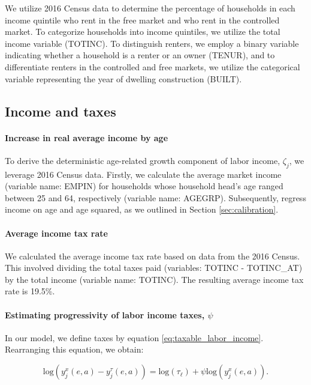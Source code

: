 \documentclass[parskip=full]{article}
\begin{document}
We utilize 2016 Census data to determine the percentage of households in each income quintile who rent in the free market and who rent in the controlled market. To categorize households into income quintiles, we utilize the total income variable (TOTINC). To distinguish renters, we employ a binary variable indicating whether a household is a renter or an owner (TENUR), and to differentiate renters in the controlled and free markets, we utilize the categorical variable representing the year of dwelling construction (BUILT).

\subsection{Income and taxes}

\paragraph{Increase in real average income by age}

To derive the deterministic age-related growth component of labor income, $\zeta_{j}$, we leverage 2016 Census data. Firstly, we calculate the average market income (variable name: EMPIN) for households whose household head's age ranged between 25 and 64, respectively (variable name: AGEGRP). Subsequently, regress income on age and age squared, as we outlined in Section \ref{sec:calibration}.

\paragraph{Average income tax rate}

We calculated the average income tax rate based on data from the 2016 Census. This involved dividing the total taxes paid (variables: TOTINC - TOTINC\_AT) by the total income (variable name: TOTINC). The resulting average income tax rate is 19.5\%.

\paragraph{Estimating progressivity of labor income taxes, $\psi$}

In our model, we define taxes by equation \eqref{eq:taxable_labor_income}. Rearranging this equation, we obtain:

\begin{equation}\label{eq:taxable_labor_income_regression}
  \mbox{log}(y^{x}_{j}(e,a)-y^{\tau}_{j}(e,a))=\mbox{log}(\tau_{\ell})+\psi \mbox{log}(y^{x}_{j}(e,a)).
\end{equation}
\end{document}
